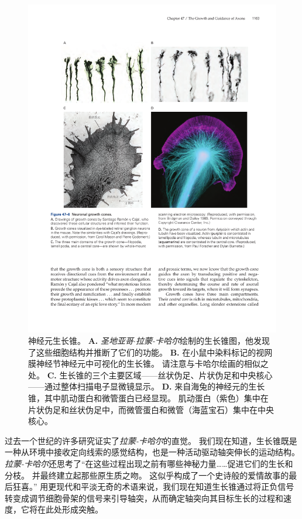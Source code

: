 \begin{figure}[htbp]
	\centering
	\includegraphics[width=0.95\linewidth]{chap47/fig_47_6}
	\caption{神经元生长锥。
		\textbf{A.} \textit{圣地亚哥$\cdot$拉蒙-卡哈尔}绘制的生长锥图，他发现了这些细胞结构并推断了它们的功能。
		\textbf{B.} 在小鼠中染料标记的视网膜神经节神经元中可视化的生长锥。
		请注意与卡哈尔绘画的相似之处。
		\textbf{C.} 生长锥的三个主要区域——丝状伪足、片状伪足和中央核心——通过整体扫描电子显微镜显示。
		\textbf{D.} 来自海兔的神经元的生长锥，其中肌动蛋白和微管蛋白已经显现。
		肌动蛋白（紫色）集中在片状伪足和丝状伪足中，而微管蛋白和微管（海蓝宝石）集中在中央核心。}
	\label{fig:47_6}
\end{figure}


过去一个世纪的许多研究证实了\textit{拉蒙-卡哈尔}的直觉。
我们现在知道，生长锥既是一种从环境中接收定向线索的感觉结构，也是一种活动驱动轴突伸长的运动结构。
\textit{拉蒙-卡哈尔}还思考了“在这些过程出现之前有哪些神秘力量……促进它们的生长和分枝。
并最终建立起那些原生质之吻。
这似乎构成了一个史诗般的爱情故事的最后狂喜。” 
用更现代和平淡无奇的术语来说，我们现在知道生长锥通过将正负信号转变成调节细胞骨架的信号来引导轴突，从而确定轴突向其目标生长的过程和速度，它将在此处形成突触。


